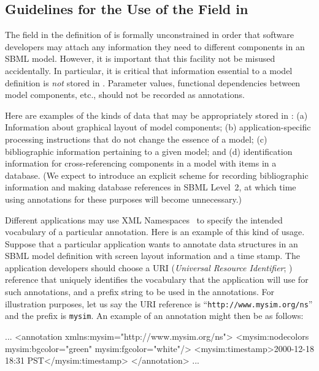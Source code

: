 \documentclass[10pt]{cekarticle}
\newcommand{\changed}[1]{\textcolor{BrickRed}{#1}}
\newenvironment{blockChanged}{\color{BrickRed}}{}
\begin{document}
\subsection{Guidelines for the Use of the \changed{} Field in
  } 
\label{sec:annotation-guidelines}

The \changed{} field in the definition of 
is formally unconstrained in order that software developers may attach any
information they need to different components in an SBML model.  However,
it is important that this facility not be misused accidentally.  In
particular, it is critical that information essential to a model definition
is \emph{not} stored in \changed{}.  Parameter values,
functional dependencies between model components, etc., should not be
recorded as annotations.

Here are examples of the kinds of data that may be appropriately stored in
\changed{}: (a) Information about graphical layout of
model components; (b) application-specific processing instructions that do
not change the essence of a model; (c) bibliographic information pertaining
to a given model; and (d) identification information for cross-referencing
components in a model with items in a database.  (We expect to introduce an
explicit scheme for recording bibliographic information and making database
references in SBML Level~2, at which time using annotations for these
purposes will become unnecessary.)

Different applications may use XML Namespaces~\citep{bray:1999} to specify
the intended vocabulary of a particular annotation.  Here is an example of
this kind of usage.  Suppose that a particular application wants to
annotate data structures in an SBML model definition with screen layout
information and a time stamp.  The application developers should choose a
URI (\emph{Universal Resource Identifier}; \citealt{harold:2001,w3c:2000})
reference that uniquely identifies the vocabulary that the
application will use for such annotations, and a prefix string to be used
in the annotations.  For illustration purposes, let us say the URI
reference is ``\texttt{http://www.mysim.org/ns}'' and the prefix is
\texttt{mysim}.  An example of an annotation might then be as follows:

\begin{blockChanged}
\begin{example}
...
<annotation xmlns:mysim="http://www.mysim.org/ns">
    <mysim:nodecolors mysim:bgcolor="green" mysim:fgcolor="white"/>
    <mysim:timestamp>2000-12-18 18:31 PST</mysim:timestamp>
</annotation>
...
\end{example}
\end{blockChanged}
\end{document}
